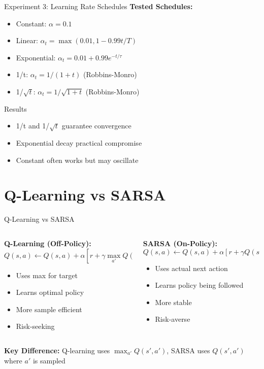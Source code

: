 \documentclass[aspectratio=169,10pt]{beamer}
\begin{document}
\begin{frame}{Experiment 3: Learning Rate Schedules}
\textbf{Tested Schedules:}
\begin{itemize}
    \item Constant: $\alpha = 0.1$
    \item Linear: $\alpha_t = \max(0.01, 1 - 0.99t/T)$
    \item Exponential: $\alpha_t = 0.01 + 0.99e^{-t/\tau}$
    \item 1/t: $\alpha_t = 1/(1+t)$ (Robbins-Monro)
    \item 1/$\sqrt{t}$: $\alpha_t = 1/\sqrt{1+t}$ (Robbins-Monro)
\end{itemize}

\begin{block}{Results}
\begin{itemize}
    \item 1/t and 1/$\sqrt{t}$ guarantee convergence
    \item Exponential decay practical compromise
    \item Constant often works but may oscillate
\end{itemize}
\end{block}
\end{frame}

\section{Q-Learning vs SARSA}

\begin{frame}{Q-Learning vs SARSA}
\begin{columns}[T]
\begin{column}{0.5\textwidth}
\textbf{Q-Learning (Off-Policy):}
$$Q(s,a) \leftarrow Q(s,a) + \alpha[r + \gamma \max_{a'} Q(s',a') - Q(s,a)]$$
\begin{itemize}
    \item Uses max for target
    \item Learns optimal policy
    \item More sample efficient
    \item Risk-seeking
\end{itemize}
\end{column}
\begin{column}{0.5\textwidth}
\textbf{SARSA (On-Policy):}
$$Q(s,a) \leftarrow Q(s,a) + \alpha[r + \gamma Q(s',a') - Q(s,a)]$$
\begin{itemize}
    \item Uses actual next action
    \item Learns policy being followed
    \item More stable
    \item Risk-averse
\end{itemize}
\end{column}
\end{columns}

\vspace{1em}
\textbf{Key Difference:} Q-learning uses $\max_{a'} Q(s',a')$, SARSA uses $Q(s',a')$ where $a'$ is sampled
\end{frame}
\end{document}
